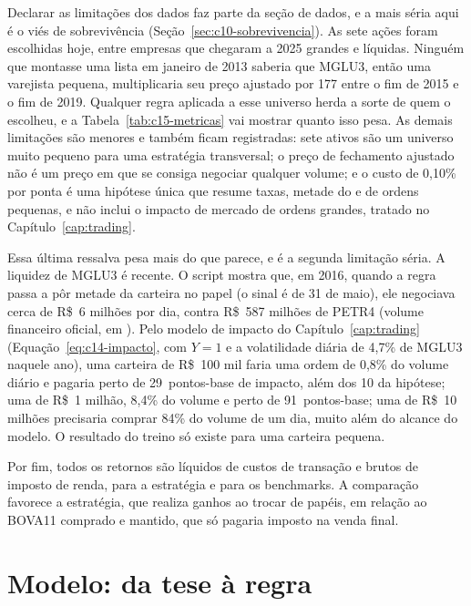 Declarar as limitações dos dados faz parte da seção de dados, e a mais séria aqui é o viés de sobrevivência (Seção~\ref{sec:c10-sobrevivencia}). As sete ações foram escolhidas hoje, entre empresas que chegaram a 2025 grandes e líquidas. Ninguém que montasse uma lista em janeiro de 2013 saberia que MGLU3, então uma varejista pequena, multiplicaria seu preço ajustado por 177 entre o fim de 2015 e o fim de 2019. Qualquer regra aplicada a esse universo herda a sorte de quem o escolheu, e a Tabela~\ref{tab:c15-metricas} vai mostrar quanto isso pesa. As demais limitações são menores e também ficam registradas: sete ativos são um universo muito pequeno para uma estratégia transversal; o preço de fechamento ajustado não é um preço em que se consiga negociar qualquer volume; e o custo de 0,10\% por ponta é uma hipótese única que resume taxas, metade do  e  de ordens pequenas, e não inclui o impacto de mercado de ordens grandes, tratado no Capítulo~\ref{cap:trading}.

Essa última ressalva pesa mais do que parece, e é a segunda limitação séria. A liquidez de MGLU3 é recente. O script  mostra que, em 2016, quando a regra passa a pôr metade da carteira no papel (o sinal é de 31 de maio), ele negociava cerca de R\$~6 milhões por dia, contra R\$~587 milhões de PETR4 (volume financeiro oficial, em ). Pelo modelo de impacto do Capítulo~\ref{cap:trading} (Equação~\eqref{eq:c14-impacto}, com $Y = 1$ e a volatilidade diária de 4,7\% de MGLU3 naquele ano), uma carteira de R\$~100 mil faria uma ordem de 0,8\% do volume diário e pagaria perto de 29~pontos-base de impacto, além dos 10 da hipótese; uma de R\$~1 milhão, 8,4\% do volume e perto de 91~pontos-base; uma de R\$~10 milhões precisaria comprar 84\% do volume de um dia, muito além do alcance do modelo. O resultado do treino só existe para uma carteira pequena.

Por fim, todos os retornos são líquidos de custos de transação e brutos de imposto de renda, para a estratégia e para os benchmarks. A comparação favorece a estratégia, que realiza ganhos ao trocar de papéis, em relação ao BOVA11 comprado e mantido, que só pagaria imposto na venda final.

\section{Modelo: da tese à regra}
\label{sec:c15-modelo}

